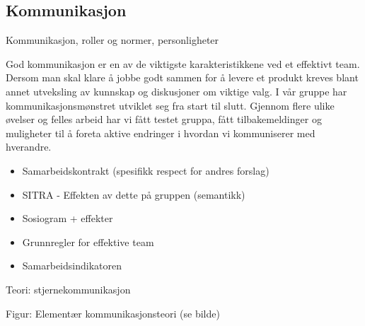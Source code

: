 \subsection{Kommunikasjon}
Kommunikasjon, roller og normer, personligheter


God kommunikasjon er en av de viktigste karakteristikkene ved et effektivt team.
Dersom man skal klare å jobbe godt sammen for å levere et produkt kreves blant annet utveksling av kunnskap og diskusjoner om viktige valg.
I vår gruppe har kommunikasjonsmønstret utviklet seg fra start til slutt.
Gjennom flere ulike øvelser og felles arbeid har vi fått testet gruppa, fått tilbakemeldinger og muligheter til å foreta aktive endringer i hvordan vi kommuniserer med hverandre.

\begin{itemize}
\item Samarbeidskontrakt (spesifikk respect for andres forslag)
\item SITRA - Effekten av dette på gruppen (semantikk)
\item Sosiogram + effekter
\item Grunnregler for effektive team
\item Samarbeidsindikatoren
\end{itemize}


%
%
%


\item Teori: stjernekommunikasjon
\item Figur: Elementær kommunikasjonsteori (se bilde)

